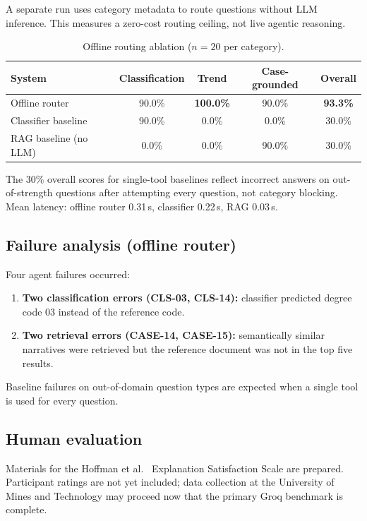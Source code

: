 \documentclass[11pt,a4paper]{article}
\begin{document}
A separate run uses category metadata to route questions without LLM inference.
This measures a zero-cost routing ceiling, not live agentic reasoning.

\begin{table}[htbp]
  \centering
  \caption{Offline routing ablation ($n=20$ per category).}
  \label{tab:benchmark}
  \begin{tabular}{@{}lcccc@{}}
    \toprule
    System & Classification & Trend & Case-grounded & Overall \\
    \midrule
    Offline router & 90.0\% & \textbf{100.0\%} & 90.0\% & \textbf{93.3\%} \\
    Classifier baseline & 90.0\% & 0.0\% & 0.0\% & 30.0\% \\
    RAG baseline (no LLM) & 0.0\% & 0.0\% & 90.0\% & 30.0\% \\
    \bottomrule
  \end{tabular}
\end{table}

The 30\% overall scores for single-tool baselines reflect incorrect answers on
out-of-strength questions after attempting every question, not category blocking.
Mean latency: offline router 0.31\,s, classifier 0.22\,s, RAG 0.03\,s.

\subsection{Failure analysis (offline router)}

Four agent failures occurred:
\begin{enumerate}
  \item \textbf{Two classification errors (CLS-03, CLS-14):} classifier
    predicted degree code 03 instead of the reference code.
  \item \textbf{Two retrieval errors (CASE-14, CASE-15):} semantically similar
    narratives were retrieved but the reference document was not in the top five
    results.
\end{enumerate}
Baseline failures on out-of-domain question types are expected when a single
tool is used for every question.

\subsection{Human evaluation}

Materials for the Hoffman et al.~\cite{Hoffman2023} Explanation Satisfaction
Scale are prepared. Participant ratings are not yet included; data collection at
the University of Mines and Technology may proceed now that the primary Groq
benchmark is complete.
\end{document}
